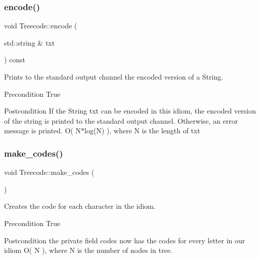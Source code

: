 \subsubsection{\texorpdfstring{encode()}{encode()}}
{\footnotesize\ttfamily void Treecode\+::encode (\begin{DoxyParamCaption}\item[{std\+::string \&}]{txt }\end{DoxyParamCaption}) const}



Prints to the standard output channel the encoded version of a String. 

\begin{DoxyPrecond}{Precondition}
True 
\end{DoxyPrecond}
\begin{DoxyPostcond}{Postcondition}
If the String txt can be encoded in this idiom, the encoded version of the string is printed to the standard output channel. Otherwise, an error message is printed.  O( N$\ast$log(\+N) ), where N is the length of txt 
\end{DoxyPostcond}
\mbox{\label{classTreecode_ab8e5229b371389a3036c548ce180ce7f}} 
\subsubsection{\texorpdfstring{make\+\_\+codes()}{make\_codes()}}
{\footnotesize\ttfamily void Treecode\+::make\+\_\+codes (\begin{DoxyParamCaption}{ }\end{DoxyParamCaption})}



Creates the code for each character in the idiom. 

\begin{DoxyPrecond}{Precondition}
True 
\end{DoxyPrecond}
\begin{DoxyPostcond}{Postcondition}
the private field codes now has the codes for every letter in our idiom  O( N ), where N is the number of nodes in tree. 
\end{DoxyPostcond}
\mbox{\label{classTreecode_a13f2c35999457b6d631796635a46ce54}} 
